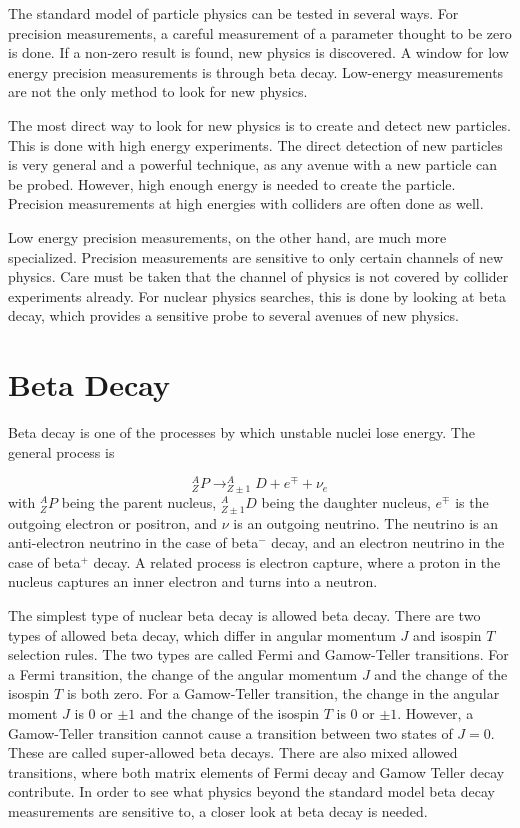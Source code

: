 \documentclass[../MaxHughesThesis.tex]{subfiles}
\begin{document}
The standard model of particle physics can be tested in several ways.
For precision measurements, a careful measurement of a parameter thought to be zero is done.
If a non-zero result is found, new physics is discovered.
A window for low energy precision measurements is through beta decay.
Low-energy measurements are not the only method to look for new physics.

The most direct way to look for new physics is to create and detect new particles.
This is done with high energy experiments. 
The direct detection of new particles is very general and a powerful technique, as any avenue with a new particle can be probed.
However, high enough energy is needed to create the particle.
Precision measurements at high energies with colliders are often done as well. 
 
Low energy precision measurements, on the other hand, are much more specialized.
Precision measurements are sensitive to only certain channels of new physics.
Care must be taken that the channel of physics is not covered by collider experiments already.
For nuclear physics searches, this is done by looking at beta decay, which provides a sensitive probe to several avenues of new physics.

\section{Beta Decay}
Beta decay is one of the processes by which unstable nuclei lose energy.
The general process is %

\begin{equation}
	\label{eq:betadecay}
	^{A}_{Z}P \rightarrow ^{A}_{Z\pm 1}D + e^{\mp} + \nu_{e}
\end{equation}
with $^{A}_{Z}P$ being the parent nucleus, $^{A}_{Z \pm 1}D$ being the daughter nucleus, $e^{\mp}$ is the outgoing electron or positron, and $\nu$ is an outgoing neutrino.
The neutrino is an anti-electron neutrino in the case of beta$^{-}$ decay, and an electron neutrino in the case of beta$^{+}$ decay. 
A related process is electron capture, where a proton in the nucleus captures an inner electron and turns into a neutron.

The simplest type of nuclear beta decay is allowed beta decay.
There are two types of allowed beta decay, which differ in angular momentum $J$ and isospin $T$ selection rules.
The two types are called Fermi and Gamow-Teller transitions. 
For a Fermi transition, the change of the angular momentum $J$ and the change of the isospin $T$ is both zero.
For a Gamow-Teller transition, the change in the angular moment $J$ is $0$ or $\pm1$ and the change of the isospin $T$ is $0$ or $\pm 1$.
However, a Gamow-Teller transition cannot cause a transition between two states of $J = 0$. 
These are called super-allowed beta decays.
There are also mixed allowed transitions, where both matrix elements of Fermi decay and Gamow Teller decay contribute.
In order to see what physics beyond the standard model beta decay measurements are sensitive to, a closer look at beta decay is needed.
\end{document}
